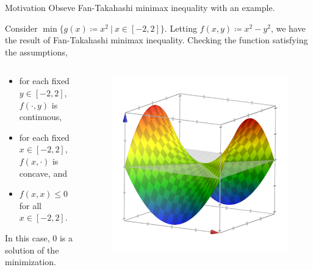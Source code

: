 \documentclass[aspectratio=169, dvipdfmx, 11pt]{beamer}
\begin{document}
\begin{frame}{Motivation}
  Obseve Fan-Takahashi minimax inequality with an example.

  Consider $\min \{ g(x) \coloneqq x^2 \:|\: x \in [-2, 2]\}$. Letting $f(x,y) \coloneqq x^2 - y^2$,
  we have the result of Fan-Takahashi minimax inequality. Checking the function satisfying the assumptions,
  \begin{columns}[t]
    \begin{column}{0.6\textwidth} %
      \begin{itemize}
        \item for each fixed $y \in [-2,2]$, $f(\cdot, y)$ is continuous,
        \item for each fixed $x \in [-2,2]$, $f(x,\cdot)$ is concave, and
        \item $f(x,x) \leq 0$ for all $x \in [-2,2]$.
      \end{itemize}

      \vspace{1cm}
      In this case, $0$ is a solution of the minimization.
    \end{column}
    \begin{column}{0.4\textwidth} %
      \begin{figure}
        \begin{center}
          \includegraphics[keepaspectratio, scale=0.12]{figures/minimax_example.png}
        \end{center}
      \end{figure}
    \end{column}
  \end{columns}
\end{frame}
\end{document}
